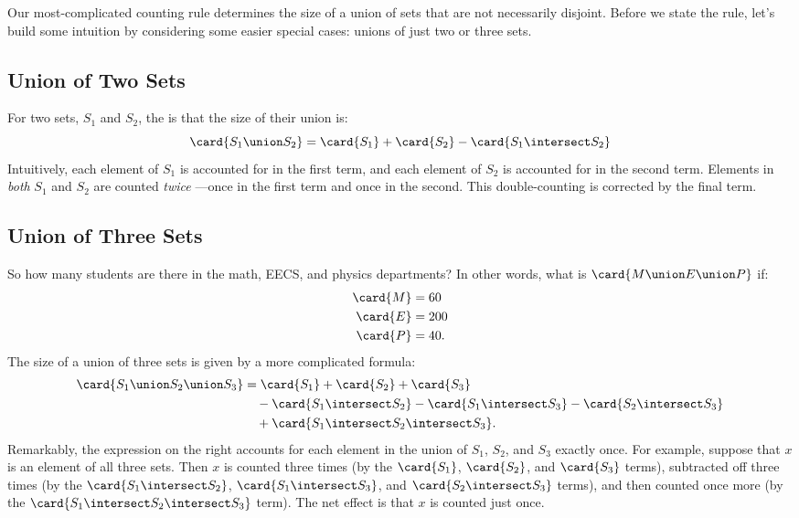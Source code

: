 Our most-complicated counting rule determines the size of a union of
sets that are not necessarily disjoint.  Before we state the rule,
let's build some intuition by considering some easier special cases:
unions of just two or three sets.

\subsection{Union of Two Sets}

For two sets, $S_1$ and $S_2$, the  is that the
size of their union is:
\begin{equation}\label{IE2}
\card{S_1 \union S_2} = \card{S_1} + \card{S_2} - \card{S_1 \intersect S_2}
\end{equation}
Intuitively, each element of $S_1$ is accounted for in the first term,
and each element of $S_2$ is accounted for in the second term.
Elements in \emph{both} $S_1$ and $S_2$ are counted
\emph{twice} ---once in the first term and once in the second.  This
double-counting is corrected by the final term.

\subsection{Union of Three Sets}

So how many students are there in the math, EECS, and physics
departments?  In other words, what is $\card{M \union E \union P}$ if:
%
\begin{align*}
\card{M} & = 60 \\
\card{E} & = 200 \\
\card{P} & = 40.
\end{align*}
%
The size of a union of three sets is given by a more complicated
 formula:
%
\begin{align*}
\card{S_1 \union S_2 \union S_3} & = \card{S_1} + \card{S_2} + \card{S_3} \\
  & \quad - \card{S_1 \intersect S_2} - \card{S_1 \intersect S_3} - \card{S_2 \intersect S_3} \\
  & \quad + \card{S_1 \intersect S_2 \intersect S_3}.
\end{align*}
%
Remarkably, the expression on the right accounts for each element in the
union of $S_1$, $S_2$, and $S_3$ exactly once.  For example, suppose that
$x$ is an element of all three sets.  Then $x$ is counted three times (by
the $\card{S_1}$, $\card{S_2}$, and $\card{S_3}$ terms), subtracted off
three times (by the $\card{S_1 \intersect S_2}$, $\card{S_1 \intersect S_3}$, and
$\card{S_2 \intersect S_3}$ terms), and then counted once more (by the
$\card{S_1 \intersect S_2 \intersect S_3}$ term).  The net effect is that $x$ is
counted just once.

